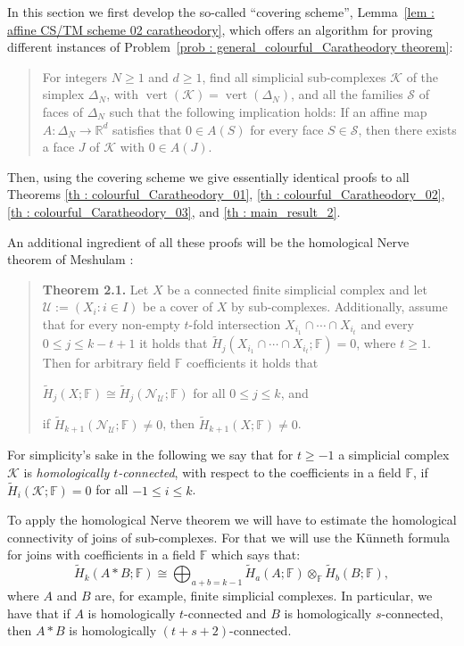 \documentclass[a4paper,11pt,reqno, english]{amsart}
\theoremstyle{definition}
\theoremstyle{remark}
\newcommand\R{\mathbb R}
\newcommand\FF{\mathbb F}
\newcommand\NN{\mathscr N}
\newcommand\U{\mathscr U}
\newcommand\K{\mathscr{K}}
\DeclareMathOperator{\vertex}{\mathrm{vert}}
\begin{document}
In this section we first develop the so-called ``covering scheme'', Lemma~\ref{lem : affine CS/TM scheme 02 caratheodory}, which offers an algorithm for proving different instances of
Problem~\ref{prob : general_colourful_Caratheodory theorem}:
\begin{quote}
	For integers $N\geq 1$ and $d\geq 1$, find all simplicial sub-complexes $\mathcal{K}$ of the simplex $\Delta_N$, with $\vertex(\mathcal{K})=\vertex(\Delta_N)$, and all the families $\mathcal{S}$ of faces of $\Delta_N$ such that the following implication holds: If an affine map $A\colon\Delta_N\longrightarrow\R^d$ satisfies that $0\in A(S)$ for every face $S\in \mathcal{S}$, then there exists a face $J$ of $\mathcal{K}$ with $0\in A(J)$.
\end{quote}
Then, using the covering scheme we give essentially identical proofs to all Theorems \ref{th : colourful_Caratheodory_01}, \ref{th : colourful_Caratheodory_02}, \ref{th : colourful_Caratheodory_03}, and \ref{th : main_result_2}.

\medskip
An additional ingredient of all these proofs will be the homological Nerve theorem of Meshulam \cite[Thm.\,2.1]{Meshulam2001}:
\begin{quote}
	{\bf Theorem 2.1.}  Let $X$ be a connected finite simplicial complex and let $\U:=(X_i : i\in I)$ be a cover of $X$ by  sub-complexes. Additionally, assume that for every non-empty $t$-fold intersection $X_{i_1}\cap \cdots\cap X_{i_t}$ and every $0\leq j\leq k-t+1$ it holds that
	$
		\widetilde{H}_j(X_{i_1}\cap \cdots\cap X_{i_t};\FF)=0
	$,
	where $t\geq 1$. Then for arbitrary field $\FF$ coefficients it holds that
	\begin{compactenum}[\rm \quad (1)]
		\item $\widetilde{H}_j(X;\FF)\cong \widetilde{H}_j(\NN_{\U};\FF)$ for all $0\leq j\leq k$, and
		\item if $\widetilde{H}_{k+1}(\NN_{\U};\FF)\neq 0$, then $\widetilde{H}_{k+1}(X;\FF)\neq 0$.
	\end{compactenum}
\end{quote}

\medskip
For simplicity's sake in the following we say that for $t\geq -1$ a simplicial complex $\K$ is {\em homologically $t$-connected}, with respect to the coefficients in a field $\FF$, if $\widetilde{H}_i(\K;\FF)=0$ for all $-1\leq i\leq k$.



\medskip
To apply the homological Nerve theorem we will have to estimate the homological connectivity of joins of sub-complexes.
For that we will use the K\"unneth formula for joins with coefficients in a field $\FF$ which says that:
\begin{equation}\label{eq:kunneth_for_join}
	\widetilde{H}_k(A*B;\FF)\cong \bigoplus_{a+b=k-1} \widetilde{H}_a(A;\FF)\otimes_{\FF} \widetilde{H}_b(B;\FF),
\end{equation}
where $A$ and $B$ are, for example, finite simplicial complexes.
In particular, we have that if $A$ is homologically $t$-connected and $B$ is homologically $s$-connected, then $A*B$ is homologically $(t+s+2)$-connected.
\end{document}
